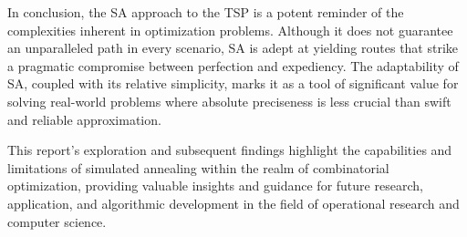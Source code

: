 \documentclass[a4paper,10pt]{article}
\begin{document}
In conclusion, the SA approach to the TSP is a potent reminder of the complexities inherent in optimization problems. Although it does not guarantee an unparalleled path in every scenario, SA is adept at yielding routes that strike a pragmatic compromise between perfection and expediency. The adaptability of SA, coupled with its relative simplicity, marks it as a tool of significant value for solving real-world problems where absolute preciseness is less crucial than swift and reliable approximation.

This report's exploration and subsequent findings highlight the capabilities and limitations of simulated annealing within the realm of combinatorial optimization, providing valuable insights and guidance for future research, application, and algorithmic development in the field of operational research and computer science.
\end{document}
